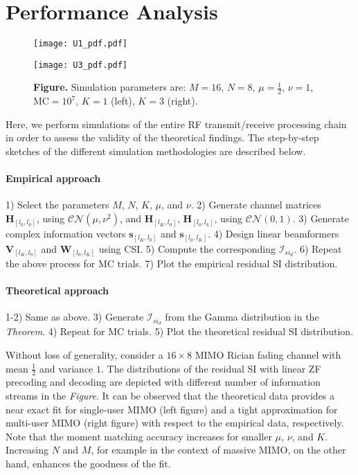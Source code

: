 \documentclass[onecolumn]{IEEEtran}
\begin{document}
\section{Performance Analysis}

\begin{figure*}
     \begin{minipage}[b]{0.5\textwidth}
          \centering
          \texttt{[image: U1\_pdf.pdf]}
     \end{minipage}%
     \begin{minipage}[b]{0.5\textwidth}
          \centering
	      \texttt{[image: U3\_pdf.pdf]}   		          
     \end{minipage}%
\caption*{{\small \textbf{Figure.} Simulation parameters are: $M = 16$, $N = 8$, $\mu = \tfrac{1}{2}$, $\nu = 1$, $\text{MC} = 10^{7}$, $K = 1$ (left), $K = 3$ (right).}}
 \end{figure*}

Here, we perform simulations of the entire RF transmit/receive processing chain in order to assess the validity of the theoretical findings. The step-by-step sketches of the different simulation methodologies are described below. 

\paragraph*{Empirical approach}
1) Select the parameters $M$, $N$, $K$, $\mu$, and $\nu$. 2) Generate channel matrices $\boldsymbol{H}_{[l_{0},l_{0}]}$, using $\mathcal{C} \mathcal{N} (\mu,\nu^{2})$, and $\boldsymbol{H}_{[l_{K},l_{0}]}$, $\boldsymbol{H}_{[l_{0},l_{k}]}$, using $\mathcal{C} \mathcal{N} (0,1)$. 3) Generate complex information vectors $\boldsymbol{s}_{[l_{K},l_{0}]}$ and $\boldsymbol{s}_{[l_{0},l_{K}]}$. 4) Design linear beamformers $\boldsymbol{V}_{[l_{K},l_{0}]}$ and $\boldsymbol{W}_{[l_{0},l_{K}]}$ using CSI. 5) Compute the corresponding $\mathcal{I}_{si_{d}}$. 6) Repeat the above process for $\text{MC}$ trials. 7) Plot the empirical residual SI distribution.

\paragraph*{Theoretical approach}
1-2) Same as above. 3) Generate $\mathcal{I}_{si_{d}}$ from the Gamma distribution in the \textit{Theorem}. 4) Repeat for $\text{MC}$ trials. 5) Plot the theoretical residual SI \nolinebreak[4] distribution. 

Without loss of generality, consider a $16 \times 8$ MIMO Rician fading channel with mean $\tfrac{1}{2}$ and variance $1$. The distributions of the residual SI with linear ZF precoding and decoding are depicted with different number of information streams in the \textit{Figure}. It can be observed that the theoretical data provides a near exact fit for single-user MIMO (left figure) and a tight approximation for multi-user MIMO (right figure) with respect to the empirical data, respectively. Note that the moment matching accuracy increases for smaller $\mu$, $\nu$, and $K$. Increasing $N$ and $M$, for example in the context of massive MIMO, on the other hand, enhances the goodness of the fit.         
\end{document}
